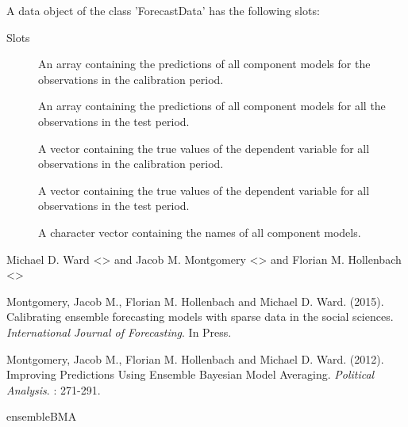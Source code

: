 \documentclass[a4paper]{book}
\begin{document}
%
\begin{Details}\relax
A data object of the class 'ForecastData' has the following slots:
\end{Details}
%
\begin{Section}{Slots}

\begin{description}

\item[] An array containing the predictions of all component models for the observations in the calibration period.

\item[] An array containing the predictions of all component models for all the observations in the test period.

\item[] A vector containing the true values of the dependent variable for all observations in the calibration period.

\item[] A vector containing the true values of the dependent variable for all observations in the test period.

\item[] A character vector containing the names of all component models.

\end{description}
\end{Section}
%
\begin{Author}\relax
Michael D. Ward <> and Jacob M. Montgomery <> and Florian M. Hollenbach <>
\end{Author}
%
\begin{References}\relax
Montgomery, Jacob M., Florian M. Hollenbach and Michael D. Ward. (2015). Calibrating ensemble forecasting models with sparse data in the social sciences.   \emph{International Journal of Forecasting}. In Press.

Montgomery, Jacob M., Florian M. Hollenbach and Michael D. Ward. (2012). Improving Predictions Using Ensemble Bayesian Model Averaging. \emph{Political Analysis}. : 271-291.
\end{References}
%
\begin{SeeAlso}\relax
ensembleBMA
\end{SeeAlso}
%
\end{document}
